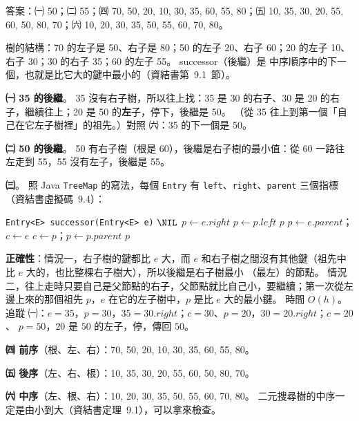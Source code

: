 \begin{pastsoln}
答案：㈠ 50；㈡ 55；㈣ 70, 50, 20, 10, 30, 35, 60, 55, 80；㈤ 10, 35, 30, 20, 55, 60, 50, 80, 70；㈥ 10, 20, 30, 35, 50, 55, 60, 70, 80。

樹的結構：70 的左子是 50、右子是 80；50 的左子 20、右子 60；20 的左子 10、右子 30；30 的右子 35；60 的左子 55。 successor（後繼）是
中序順序中的下一個，也就是比它大的鍵中最小的（資結書第~9.1~節）。

\textbf{㈠ 35 的後繼}。 35 沒有右子樹，所以往上找：35 是 30 的右子、30 是 20 的右子，繼續往上；20 是 50 的\textbf{左}子，停下，後繼是 50。
（從 35 往上到第一個「自己在它左子樹裡」的祖先。）對照 ㈥：35 的下一個是 50。

\textbf{㈡ 50 的後繼}。 50 有右子樹（根是 60），後繼是右子樹的最小值：從 60 一路往左走到 55，55 沒有左子，後繼是 55。

\textbf{㈢}。 照 Java \texttt{TreeMap} 的寫法，每個 \texttt{Entry} 有 \texttt{left}、\texttt{right}、\texttt{parent} 三個指標（資結書虛擬碼~9.4）：
\begin{pseudo}[unbreakable]{\texttt{Entry<E> successor(Entry<E> e)}}
        \State \Return $\NIL$
     
        \State $p \gets e.\mathit{right}$
            \State $p \gets p.\mathit{left}$
        \EndWhile
        \State \Return $p$ 
    \Else {}
        \State $p \gets e.\mathit{parent}$；$c \gets e$
            \State $c \gets p$；$p \gets p.\mathit{parent}$
        \EndWhile
        \State \Return $p$ 
    \EndIf
\EndFunction
\end{pseudo}
\textbf{正確性}：情況一，右子樹的鍵都比 $e$ 大，而 $e$ 和右子樹之間沒有其他鍵（祖先中比 $e$ 大的，也比整棵右子樹大），所以後繼是右子樹最小
（最左）的節點。 情況二，往上走時只要自己是父節點的右子，父節點就比自己小，要繼續；第一次從左邊上來的那個祖先 $p$，$e$ 在它的左子樹中，$p$
是比 $e$ 大的最小鍵。 時間 $O(h)$。 追蹤 ㈠：$e = 35$，$p = 30$，$35 = 30.\mathit{right}$；$c = 30$、$p = 20$，$30 = 20.\mathit{right}$；$c = 20$、
$p = 50$，$20$ 是 $50$ 的左子，停，傳回 $50$。

\textbf{㈣ 前序}（根、左、右）：70, 50, 20, 10, 30, 35, 60, 55, 80。

\textbf{㈤ 後序}（左、右、根）：10, 35, 30, 20, 55, 60, 50, 80, 70。

\textbf{㈥ 中序}（左、根、右）：10, 20, 30, 35, 50, 55, 60, 70, 80。 二元搜尋樹的中序一定是由小到大（資結書定理~9.1），可以拿來檢查。
\end{pastsoln}
